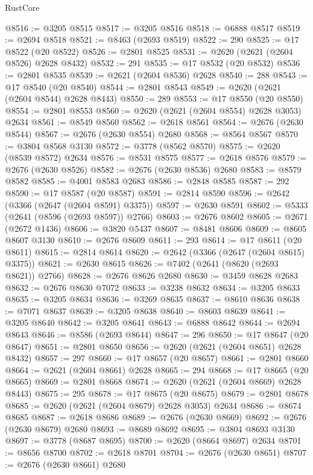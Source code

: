 \begin{lexlean}{RustCore}
\begin{coremodule}
@8516 := @3205 @8515
@8517 := @3205 @8516
@8518 := @6888 @8517
@8519 := @2694 @8518
@8521 := @8463 (@2693 @8519)
@8522 := 290
@8525 := @17 @8522 (@20 @8522)
@8526 := @2801 @8525
@8531 := @2620 (@2621 (@2604 @8526) @2628 @8432)
@8532 := 291
@8535 := @17 @8532 (@20 @8532)
@8536 := @2801 @8535
@8539 := @2621 (@2604 @8536) @2628
@8540 := 288
@8543 := @17 @8540 (@20 @8540)
@8544 := @2801 @8543
@8549 := @2620 (@2621 (@2604 @8544) @2628 @8443)
@8550 := 289
@8553 := @17 @8550 (@20 @8550)
@8554 := @2801 @8553
@8560 := @2620 (@2621 (@2604 @8554) @2628 @3053) @2634
@8561 := @8549 @8560
@8562 := @2618 @8561
@8564 := @2676 (@2630 @8544)
@8567 := @2676 (@2630 @8554) @2680
@8568 := @8564 @8567
@8570 := @3804 @8568 @3130
@8572 := @3778 (@8562 @8570)
@8575 := @2620 (@8539 @8572) @2634
@8576 := @8531 @8575
@8577 := @2618 @8576
@8579 := @2676 (@2630 @8526)
@8582 := @2676 (@2630 @8536) @2680
@8583 := @8579 @8582
@8585 := @4001 @8583 @2683
@8586 := @2848 @8585
@8587 := 292
@8590 := @17 @8587 (@20 @8587)
@8591 := @2814 @8590
@8596 := @2642 (@3366 (@2647 (@2604 @8591) @3375))
@8597 := @2630 @8591
@8602 := @5333 (@2641 (@8596 (@2693 @8597)) @2766)
@8603 := @2676 @8602
@8605 := @2671 (@2672 @1436)
@8606 := @3820 @5437
@8607 := @8481 @8606
@8609 := @8605 @8607 @3130
@8610 := @2676 @8609
@8611 := 293
@8614 := @17 @8611 (@20 @8611)
@8615 := @2814 @8614
@8620 := @2642 (@3366 (@2647 (@2604 @8615) @3375))
@8621 := @2630 @8615
@8626 := @7402 (@2641 (@8620 (@2693 @8621)) @2766)
@8628 := @2676 @8626 @2680
@8630 := @3459 @8628 @2683
@8632 := @2676 @8630 @7072
@8633 := @3238 @8632
@8634 := @3205 @8633
@8635 := @3205 @8634
@8636 := @3269 @8635
@8637 := @8610 @8636
@8638 := @7071 @8637
@8639 := @3205 @8638
@8640 := @8603 @8639
@8641 := @3205 @8640
@8642 := @3205 @8641
@8643 := @6888 @8642
@8644 := @2694 @8643
@8646 := @8586 (@2693 @8644)
@8647 := 296
@8650 := @17 @8647 (@20 @8647)
@8651 := @2801 @8650
@8656 := @2620 (@2621 (@2604 @8651) @2628 @8432)
@8657 := 297
@8660 := @17 @8657 (@20 @8657)
@8661 := @2801 @8660
@8664 := @2621 (@2604 @8661) @2628
@8665 := 294
@8668 := @17 @8665 (@20 @8665)
@8669 := @2801 @8668
@8674 := @2620 (@2621 (@2604 @8669) @2628 @8443)
@8675 := 295
@8678 := @17 @8675 (@20 @8675)
@8679 := @2801 @8678
@8685 := @2620 (@2621 (@2604 @8679) @2628 @3053) @2634
@8686 := @8674 @8685
@8687 := @2618 @8686
@8689 := @2676 (@2630 @8669)
@8692 := @2676 (@2630 @8679) @2680
@8693 := @8689 @8692
@8695 := @3804 @8693 @3130
@8697 := @3778 (@8687 @8695)
@8700 := @2620 (@8664 @8697) @2634
@8701 := @8656 @8700
@8702 := @2618 @8701
@8704 := @2676 (@2630 @8651)
@8707 := @2676 (@2630 @8661) @2680

\end{coremodule}
\end{lexlean}
